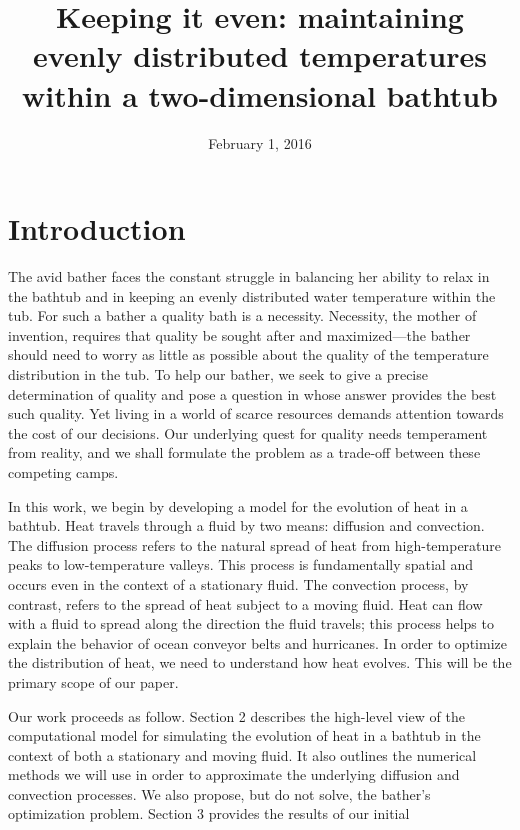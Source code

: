 \documentclass[12pt]{amsart}
\title{Keeping it even: maintaining evenly distributed temperatures within a
two-dimensional bathtub}
\date{February 1, 2016}
\begin{document}
\maketitle

\thispagestyle{fancy}
\tableofcontents

\begin{abstract}
\end{abstract}

\section{Introduction}

The avid bather faces the constant struggle in balancing her ability to relax in
the bathtub and in keeping an evenly distributed water temperature within the
tub. For such a bather a quality bath is a necessity. Necessity, the mother of
invention, requires that quality be sought after and maximized---the bather
should need to worry as little as possible about the quality of the temperature
distribution in the tub. To help our bather, we seek to give a precise
determination of quality and pose a question in whose answer provides the best
such quality. Yet living in a world of scarce resources demands attention
towards the cost of our decisions. Our underlying quest for quality needs
temperament from reality, and we shall formulate the problem as a trade-off
between these competing camps.

In this work, we begin by developing a model for the evolution of heat in a
bathtub. Heat travels through a fluid by two means: diffusion and convection.
The diffusion process refers to the natural spread of heat from high-temperature
peaks to low-temperature valleys. This process is fundamentally spatial and
occurs even in the context of a stationary fluid. The convection process, by
contrast, refers to the spread of heat subject to a moving fluid. Heat can flow
with a fluid to spread along the direction the fluid travels; this process helps
to explain the behavior of ocean conveyor belts and hurricanes. In order to
optimize the distribution of heat, we need to understand how heat evolves. This
will be the primary scope of our paper.

Our work proceeds as follow. Section 2 describes the high-level view of the
computational model for simulating the evolution of heat in a bathtub in the
context of both a stationary and moving fluid. It also outlines the numerical
methods we will use in order to approximate the underlying diffusion and
convection processes. We also propose, but do not solve, the bather's
optimization problem. Section 3 provides the results of our initial 
\end{document}
